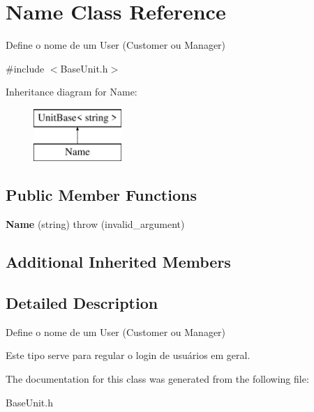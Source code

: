 \hypertarget{className}{\section{Name Class Reference}
\label{className}
}


Define o nome de um User (Customer ou Manager)  




{\ttfamily \#include $<$Base\-Unit.\-h$>$}

Inheritance diagram for Name\-:\begin{figure}[H]
\begin{center}
\leavevmode
\includegraphics[height=2.000000cm]{className}
\end{center}
\end{figure}
\subsection*{Public Member Functions}
\begin{DoxyCompactItemize}
\item 
\hypertarget{className_a8dd10bd69cabf897c06439b32c9070f7}{{\bfseries Name} (string)  throw (invalid\-\_\-argument)}\label{className_a8dd10bd69cabf897c06439b32c9070f7}

\end{DoxyCompactItemize}
\subsection*{Additional Inherited Members}


\subsection{Detailed Description}
Define o nome de um User (Customer ou Manager) 

Este tipo serve para regular o login de usuários em geral. 

The documentation for this class was generated from the following file\-:\begin{DoxyCompactItemize}
\item 
Base\-Unit.\-h\end{DoxyCompactItemize}

